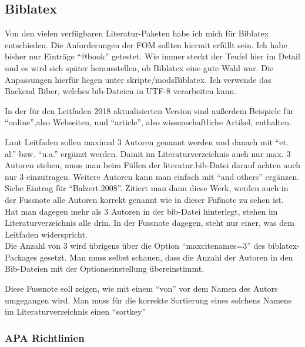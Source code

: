 \documentclass[12pt,oneside,titlepage]{scrartcl}
\begin{document}

\subsection{Biblatex}
Von den vielen verfügbaren Literatur-Paketen habe ich mich für Biblatex entschieden. Die Anforderungen der FOM sollten hiermit erfüllt sein. Ich habe bisher nur Einträge \enquote{@book} getestet. Wie immer steckt der Teufel hier im Detail und es wird sich später herausstellen, ob Biblatex eine gute Wahl war. Die Anpassungen hierfür liegen unter skripte/modsBiblatex. Ich verwende das Backend Biber, welches bib-Dateien in UTF-8 verarbeiten kann.

In der für den Leitfaden 2018 aktualisierten Version sind außerdem Beispiele für \enquote{online},also Webseiten, und \enquote{article}, also wissenschaftliche Artikel, enthalten.

Laut Leitfaden sollen maximal 3 Autoren genannt werden und danach mit
\enquote{et. al.} bzw. \enquote{u.a.} ergänzt werden. Damit im Literaturverzeichnis auch nur max.
3 Autoren stehen, muss man beim Füllen der literatur.bib-Datei darauf achten auch nur 3
einzutragen. Weitere Autoren kann man einfach mit \enquote{and others} ergänzen.
Siehe Eintrag für \enquote{Balzert.2008}. Zitiert man dann diese Werk, werden auch in
der Fussnote alle Autoren korrekt genannt wie in dieser
Fußnote\cite[Vgl.][S.1]{Balzert7} zu sehen ist.\\
Hat man dagegen mehr als 3 Autoren in der bib-Datei hinterlegt, stehen im
Literaturverzeichnis alle drin. In der Fussnote dagegen, steht nur
einer\parencite[][S. 1]{becker2016hrsg}, was dem Leitfaden widerspricht.\\
Die Anzahl von 3 wird übrigens über die Option \enquote{maxcitenames=3} des
biblatex-Packages gesetzt. Man muss selbst schauen, dass die Anzahl der Autoren
in den Bib-Dateien mit der Optionseinstellung übereinstimmt.

Diese Fussnote soll zeigen, wie mit einem \enquote{von} vor dem Namen des Autors
umgegangen wird\parencite{Lucke2018hrsg}. Man muss für die korrekte
Sortierung eines solchens Namens im Literaturverzeichnis einen \enquote{sortkey}


\subsubsection{APA Richtlinien}
\end{document}
